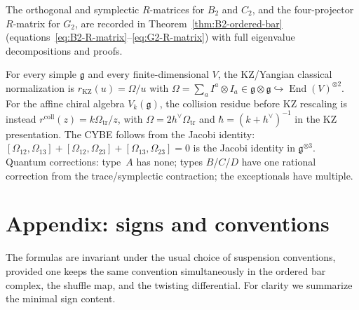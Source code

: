 The orthogonal and symplectic $R$-matrices for $B_2$ and
$C_2$, and the four-projector $R$-matrix for $G_2$, are
recorded in Theorem~\ref{thm:B2-ordered-bar}
(equations~\eqref{eq:B2-R-matrix}--\eqref{eq:G2-R-matrix})
with full eigenvalue decompositions and proofs.

\begin{remark}
\label{rem:universal-classical}
For every simple $\mathfrak{g}$ and every finite-dimensional $V$, the
KZ/Yangian classical normalization is $r_{\mathrm{KZ}}(u)=\Omega/u$ with
$\Omega = \sum_a I^a \otimes I_a
\in \mathfrak{g} \otimes \mathfrak{g}
\hookrightarrow
\operatorname{End}(V)^{\otimes 2}$.
For the affine chiral algebra $V_k(\mathfrak{g})$, the collision
residue before KZ rescaling is instead
$r^{\mathrm{coll}}(z)=k\Omega_{\mathrm{tr}}/z$, with
$\Omega=2h^\vee\Omega_{\mathrm{tr}}$ and
$\hbar=(k+h^\vee)^{-1}$ in the KZ presentation.
The CYBE follows from the Jacobi identity:
$[\Omega_{12},\Omega_{13}] + [\Omega_{12},\Omega_{23}]
+ [\Omega_{13},\Omega_{23}] = 0$ is the Jacobi identity
in $\mathfrak{g}^{\otimes 3}$.
Quantum corrections: type~$A$ has none; types $B$/$C$/$D$
have one rational correction from the trace/symplectic
contraction; the exceptionals have multiple.
\end{remark}
\appendix

\section{Appendix: signs and conventions}

The formulas are invariant under the usual choice of suspension conventions, provided one keeps
the same convention simultaneously in the ordered bar complex, the shuffle map, and the twisting
differential. For clarity we summarize the minimal sign content.

